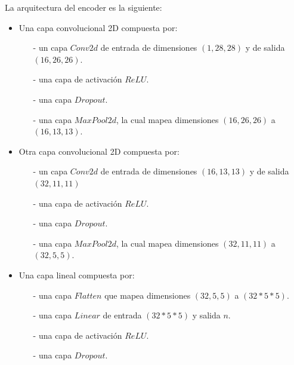 \documentclass[aps,prl,reprint,groupedaddress]{revtex4-2}
\begin{document}
La arquitectura del encoder es la siguiente:
\begin{itemize}
  \item Una capa convolucional 2D compuesta por:
  \begin{itemize}
    \item [-] un capa $Conv2d$ de entrada de dimensiones $(1, 28, 28)$ y de 
    salida $(16, 26, 26)$.
    \item [-] una capa de activación $ReLU$.
    \item [-] una capa $Dropout$.
    \item [-] una capa $MaxPool2d$, la cual mapea dimensiones $(16, 26, 26)$ a
    $(16, 13, 13)$.
  \end{itemize}
  \item Otra capa convolucional 2D compuesta por:
  \begin{itemize}
    \item [-] un capa $Conv2d$ de entrada de dimensiones $(16, 13, 13)$ y de 
    salida $(32, 11, 11)$
    \item [-] una capa de activación $ReLU$.
    \item [-] una capa $Dropout$.
    \item [-] una capa $MaxPool2d$, la cual mapea dimensiones $(32, 11, 11)$ a
    $(32, 5, 5)$.
  \end{itemize}
  \item Una capa lineal compuesta por:
  \begin{itemize}
    \item [-] una capa $Flatten$ que mapea dimensiones $(32, 5, 5)$ a $(32*5*5)$.
    \item [-] una capa $Linear$ de entrada $(32*5*5)$ y salida $n$.
    \item [-] una capa de activación $ReLU$.
    \item [-] una capa $Dropout$.
  \end{itemize}
\end{itemize}
\end{document}
